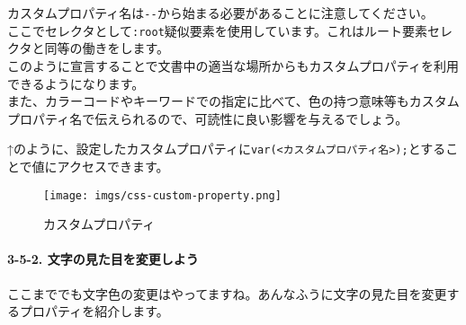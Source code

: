\begin{Shaded}
\begin{Highlighting}[]
\NormalTok{ \{}
\OperatorTok{\textgreater{}}
\NormalTok{\}}
\end{Highlighting}
\end{Shaded}

カスタムプロパティ名は\texttt{-\/-}から始まる必要があることに注意してください。\\
ここでセレクタとして\texttt{:root}疑似要素を使用しています。これはルート要素セレクタと同等の働きをします。\\
このように宣言することで文書中の適当な場所からもカスタムプロパティを利用できるようになります。\\
また、カラーコードやキーワードでの指定に比べて、色の持つ意味等もカスタムプロパティ名で伝えられるので、可読性に良い影響を与えるでしょう。

\begin{Shaded}
\begin{Highlighting}[]
\NormalTok{ \{}
  \NormalTok{: }\OperatorTok{;}
\NormalTok{\}}

  \NormalTok{: }\FunctionTok{)}\OperatorTok{;}
\NormalTok{\}}
\end{Highlighting}
\end{Shaded}

↑のように、設定したカスタムプロパティに\texttt{var(\textless{}カスタムプロパティ名\textgreater{});}とすることで値にアクセスできます。

\begin{figure}
\centering
\texttt{[image: imgs/css-custom-property.png]}
\caption{カスタムプロパティ}
\end{figure}

\paragraph{3-5-2.
文字の見た目を変更しよう}\label{ux6587ux5b57ux306eux898bux305fux76eeux3092ux5909ux66f4ux3057ux3088ux3046}

ここまででも文字色の変更はやってますね。あんなふうに文字の見た目を変更するプロパティを紹介します。

